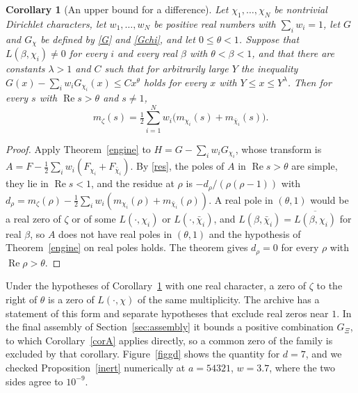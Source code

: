 \documentclass[11pt,letterpaper]{article}
\newtheorem{corollary}[theorem]{Corollary}
\numberwithin{equation}{section}
\begin{document}
\begin{corollary}[An upper bound for a difference]\label{corC}
Let $\chi_1,\dots,\chi_N$ be nontrivial Dirichlet characters, let $w_1,\dots,w_N$ be positive real numbers with $\sum_iw_i=1$, let $G$ and $G_\chi$ be defined by \eqref{G} and \eqref{Gchi}, and let $0\le\theta<1$. Suppose that $L(\beta,\chi_i)\ne0$ for every $i$ and every real $\beta$ with $\theta<\beta<1$, and that there are constants $\lambda>1$ and $C$ such that for arbitrarily large $Y$ the inequality $G(x)-\sum_iw_iG_{\chi_i}(x)\le Cx^\theta$ holds for every $x$ with $Y\le x\le Y^\lambda$. Then for every $s$ with $\operatorname{Re}s>\theta$ and $s\ne1$,
\[
m_\zeta(s)=\tfrac12\sum_{i=1}^Nw_i\big(m_{\chi_i}(s)+m_{\bar\chi_i}(s)\big).
\]
\end{corollary}
\begin{proof}
Apply Theorem~\ref{engine} to $H=G-\sum_iw_iG_{\chi_i}$, whose transform is $A=F-\tfrac12\sum_iw_i(F_{\chi_i}+F_{\bar\chi_i})$. By \eqref{res}, the poles of $A$ in $\operatorname{Re}s>\theta$ are simple, they lie in $\operatorname{Re}s<1$, and the residue at $\rho$ is $-d_\rho/(\rho(\rho-1))$ with $d_\rho=m_\zeta(\rho)-\tfrac12\sum_iw_i(m_{\chi_i}(\rho)+m_{\bar\chi_i}(\rho))$. A real pole in $(\theta,1)$ would be a real zero of $\zeta$ or of some $L(\cdot,\chi_i)$ or $L(\cdot,\bar\chi_i)$, and $L(\beta,\bar\chi_i)=\overline{L(\beta,\chi_i)}$ for real $\beta$, so $A$ does not have real poles in $(\theta,1)$ and the hypothesis of Theorem~\ref{engine} on real poles holds. The theorem gives $d_\rho=0$ for every $\rho$ with $\operatorname{Re}\rho>\theta$.
\end{proof}

Under the hypotheses of Corollary~\ref{corC} with one real character, a zero of $\zeta$ to the right of $\theta$ is a zero of $L(\cdot,\chi)$ of the same multiplicity. The archive has a statement of this form and separate hypotheses that exclude real zeros near $1$. In the final assembly of Section~\ref{sec:assembly} it bounds a positive combination $G_\Xi$, to which Corollary~\ref{corA} applies directly, so a common zero of the family is excluded by that corollary. Figure~\ref{figgd} shows the quantity for $d=7$, and we checked Proposition~\ref{inert} numerically at $a=54321$, $w=3.7$, where the two sides agree to $10^{-9}$.
\end{document}
